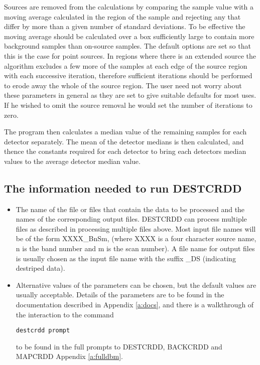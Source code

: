 \documentclass[twoside,11pt]{article}
\begin{document}
Sources are removed from the calculations by comparing the sample value with
a moving average calculated in the region of the sample and rejecting any that
differ by more than a given number of standard deviations. To be effective the
moving average should be calculated over a box sufficiently large to contain 
more background samples than on-source samples. The default  options are set  
so that this is the  case for point sources. In regions where there is an
extended source the algorithm excludes a few more of the samples at each edge
of the source region with each successive iteration, therefore sufficient
iterations should be performed to erode away the whole of the source region.
The user need not worry about these parameters in general as they  are set to
give suitable defaults for most uses. If he wished to omit the source removal
he would set the number of iterations to zero.

The program then calculates a median value of the remaining samples for each 
detector separately. The mean of the detector medians is then calculated, and
thence the constants required for each detector to bring each detectors median 
values to the average detector median value.
\subsection{The information needed to run DESTCRDD}
\begin{itemize}
\item The name of the file or files that contain the data to be processed and
the names of the corresponding output files. DESTCRDD can process multiple 
files as described in processing multiple files above. Most input file names
will be of the form XXXX\_BnSm, (where XXXX is a four character source name, n
is the band number and m is the scan number). A file name for output files is 
usually chosen as the input file name with the suffix \_DS (indicating destriped
data).
\item Alternative values of the parameters can be chosen, but the default 
values are usually acceptable. Details of the parameters are to be found in
the documentation described in Appendix \ref{a:docs}, and there is a
walkthrough of the interaction to the command
\begin{small}
\begin{verbatim}
destcrdd prompt
\end{verbatim}
\end{small}
to be found in the full prompts to DESTCRDD, BACKCRDD and MAPCRDD Appendix
\ref{a:fulldbm}.
\end{itemize}
\end{document}
